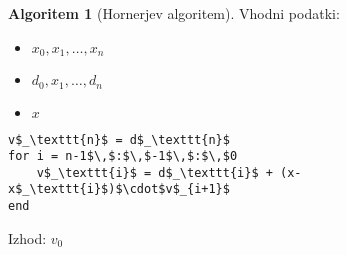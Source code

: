 \documentclass[11pt]{article}
\theoremstyle{definition}
\theoremstyle{definition}
\newtheorem*{algoritem}{Algoritem}
\begin{document}
\pagebreak
\begin{algoritem}[Hornerjev algoritem]

Vhodni podatki: 
\begin{itemize}
	\item $x_0, x_1, \ldots, x_n$
	\item $d_0, x_1, \ldots, d_n$
	\item $x$
\end{itemize}
\begin{lstlisting}
v$_\texttt{n}$ = d$_\texttt{n}$
for i = n-1$\,$:$\,$-1$\,$:$\,$0
    v$_\texttt{i}$ = d$_\texttt{i}$ + (x-x$_\texttt{i}$)$\cdot$v$_{i+1}$
end
\end{lstlisting}
Izhod: $v_0$

\end{algoritem}
\vspace{0.5cm}


\pagebreak

\end{document}
